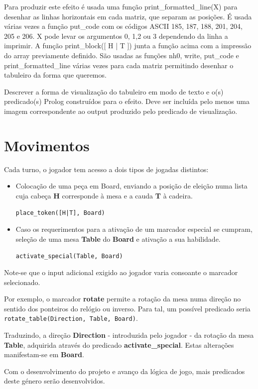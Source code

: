 \documentclass[a4paper]{article}
\begin{document}
Para produzir este efeito é usada uma função print\_formatted\_line(X) para desenhar as linhas horizontais em cada matriz, que separam as posições. É usada várias vezes a função put\_code com os códigos ASCII 185, 187, 188, 201, 204, 205 e 206. X pode levar os argumentos 0, 1,2 ou 3 dependendo da linha a imprimir. A função print\_block([ H | T ]) junta a função acima com a impressão do array previamente definido. São usadas as funções nh0, write, put\_code e print\_formatted\_line várias vezes para cada matriz permitindo desenhar o tabuleiro da forma que queremos.

Descrever a forma de visualização do tabuleiro em modo de texto e o(s) predicado(s) Prolog construídos para o efeito.
Deve ser incluída pelo menos uma imagem correspondente ao output produzido pelo predicado de visualização.


\newpage
\section{Movimentos}

Cada turno, o jogador tem acesso a dois tipos de jogadas distintos:

\begin{itemize}
\item Colocação de uma peça em Board, enviando a posição de eleição numa lista cuja cabeça \textbf{H} corresponde à mesa e a cauda \textbf{T} à cadeira.

\texttt{place\_token([H|T], Board)}

\item Caso os requerimentos para a ativação de um marcador especial se cumpram, seleção de uma mesa \textbf{Table} do \textbf{Board} e ativação a sua habilidade.

\texttt{activate\_special(Table, Board)}
\end{itemize}

Note-se que o input adicional exigido ao jogador varia consoante o marcador selecionado. \newline

Por exemplo, o marcador \textbf{rotate} permite a rotação da mesa numa direção no sentido dos ponteiros do relógio ou inverso. Para tal, um possível predicado seria \texttt{rotate\_table(Direction, Table, Board)}. 	\newline

Traduzindo, a direção \textbf{Direction} - introduzida pelo jogador - da rotação da mesa \textbf{Table}, adquirida através do predicado \textbf{activate\_special}. Estas alterações manifestam-se em \textbf{Board}. \newline

Com o desenvolvimento do projeto e avanço da lógica de jogo, mais predicados deste género serão desenvolvidos.
\end{document}
